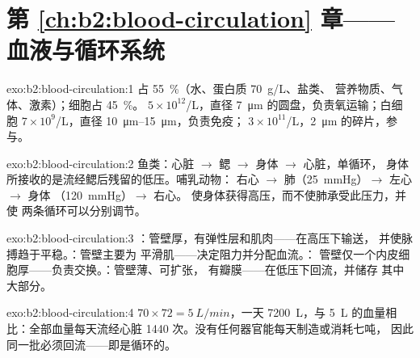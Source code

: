 \section*{第 \ref{ch:b2:blood-circulation} 章——血液与循环系统}

\begin{solution}{exo:b2:blood-circulation:1}
占 \qty{55}{\%}（水、蛋白质 \qty{70}{g/L}、盐类、
营养物质、气体、激素）；细胞占 \qty{45}{\%}。 $5\times
10^{12}$/L，直径 \qty{7}{\micro m} 的圆盘，负责氧运输；白细胞
$7\times 10^{9}$/L，直径 \qtyrange{10}{15}{\micro m}，负责免疫；
$3\times 10^{11}$/L，\qty{2}{\micro m} 的碎片，参与。
\end{solution}

\begin{solution}{exo:b2:blood-circulation:2}
鱼类：心脏 $\to$ 鳃 $\to$ 身体 $\to$ 心脏，单循环，
身体所接收的是流经鳃后残留的低压。哺乳动物：
右心 $\to$ 肺（\qty{25}{mmHg}）$\to$ 左心 $\to$ 身体
（\qty{120}{mmHg}）$\to$ 右心。
使身体获得高压，而不使肺承受此压力，并使
两条循环可以分别调节。
\end{solution}

\begin{solution}{exo:b2:blood-circulation:3}
：管壁厚，有弹性层和肌肉——在高压下输送，
并使脉搏趋于平稳。：管壁主要为
平滑肌——决定阻力并分配血流。：
管壁仅一个内皮细胞厚——负责交换。：管壁薄、可扩张，
有瓣膜——在低压下回流，并储存
其中大部分。
\end{solution}

\begin{solution}{exo:b2:blood-circulation:4}
$70\times 72 = \qty{5}{L/min}$，一天 \qty{7200}{L}，与
\qty{5}{L} 的血量相比：全部血量每天流经心脏 \num{1440}
次。没有任何器官能每天制造或消耗七吨，
因此同一批必须回流——即是循环的。
\end{solution}

